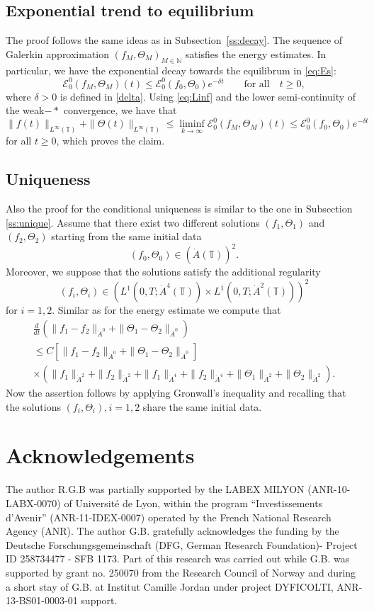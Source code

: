 \documentclass[reqno,11pt]{amsart}
\newcommand{\NN}{{\mathbb N}}
\newcommand{\TT}{{\mathbb T}}
\begin{document}
{\subsection{Exponential trend to equilibrium} The proof follows the same ideas as in Subsection~\ref{ss:decay}.
The sequence of Galerkin approximation $(f_M, \Theta_M)_{M\in\NN}$ satisfies the energy estimates. In particular, we have the exponential decay towards the equilibrum in \eqref{eq:Es}:
 \[
 \mathscr{E}^0_0(f_M,\Theta_M)(t)\leq \mathscr{E}_0^0(f_0,\Theta_0)e^{-\delta t}\qquad \mbox{for all}\quad t\geq0,
 \]
 where $\delta>0$ is defined in \eqref{delta}.
 Using \eqref{eq:Linf} and the lower semi-continuity of the weak$-*$ convergence, we have that
 \begin{equation*}
 \|f(t)\|_{L^\infty(\TT)}+\|\Theta(t)\|_{L^\infty(\TT)}\leq \liminf_{k\to \infty}\mathscr{E}^0_0(f_M,\Theta_M)(t)\leq 	\mathscr{E}_0^0(f_0,\Theta_0)e^{-\delta t}
 \end{equation*}
for all $t\geq 0$, which proves the claim.

\subsection{Uniqueness} Also the proof for the conditional uniqueness is similar to the one in Subsection \ref{ss:unique}.
 Assume that there exist two different solutions $(f_1,\Theta_1)$ and $(f_2,\Theta_2)$ starting from the same initial data 
 $$
 (f_0,\Theta_0)\in \left(\dot A(\TT)\right)^2.
 $$ Moreover, we suppose that the solutions satisfy the additional regularity 
 $$
 (f_i,\Theta_i)\in \left( L^{1}(0,T;\dot A^4(\TT))\times L^1(0,T;\dot A^2(\TT))\right)^2
 $$ for $i=1,2$. Similar as for the energy estimate we compute that
 \begin{multline*}
 \frac{d}{dt}\left(\|f_1-f_2\|_{\dot A^0}+\|\Theta_1-\Theta_2\|_{\dot A^0}\right)\\
 \leq C \left[\|f_1-f_2\|_{\dot A^0}+\|\Theta_1-\Theta_2\|_{\dot A^0}\right]\\
 \times\left(\|f_1\|_{\dot A^2}+\|f_2\|_{\dot A^2}+\|f_1\|_{\dot A^4}+\|f_2\|_{\dot A^4}+\|\Theta_1\|_{\dot A^2}+\|\Theta_2\|_{\dot A^2}\right).
 \end{multline*} 
 Now the assertion follows by applying Gronwall's inequality and recalling that the solutions $(f_i,\Theta_i), i=1,2$ share the same initial data.
 
 \bigskip
 
\section*{Acknowledgements}The author R.G.B was partially supported by the LABEX MILYON (ANR-10-LABX-0070) of Universit\'e de Lyon, within the program ``Investissements d'Avenir'' (ANR-11-IDEX-0007) operated by the French National Research Agency (ANR).  The author G.B. gratefully acknowledges the funding by the Deutsche Forschungsgemeinschaft (DFG, German Research Foundation)- Project ID 258734477 - SFB 1173.
Part of this research was carried out while G.B. was supported by grant no. 250070 from the Research Council of Norway and during a short  stay of G.B. at Institut Camille Jordan under project DYFICOLTI, ANR-13-BS01-0003-01 support. 

}
\end{document}

